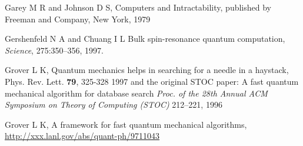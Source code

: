\documentclass{article}
\begin{document}
\begin{thebibliography}{12}
Garey M R and Johnson D S,
Computers and Intractability, 
published by Freeman and Company,
		New York,
		1979

% 
% 
% 

Gershenfeld N A and  Chuang I L
\newblock Bulk spin-resonance quantum computation,
{\em Science}, 275:350--356, 1997.






% 
% 
% 
% 
% 
% 
% 
% 
% 
% 

 Grover L K,
Quantum mechanics helps in searching for a needle in a haystack, 
Phys. Rev. Lett. {\bf 79}, 325-328  1997
and the original STOC paper:
A fast quantum mechanical algorithm for database search
{\em Proc. of the 28th Annual ACM Symposium on 
Theory of Computing (STOC)} 212--221, 1996


 Grover L K, 
A framework for fast quantum mechanical algorithms,
\hyperref{http://xxx.lanl.gov/abs/quant-ph/9711043}{}{}
{http://xxx.lanl.gov/abs/quant-ph/9711043}




\end{thebibliography}
\end{document}
